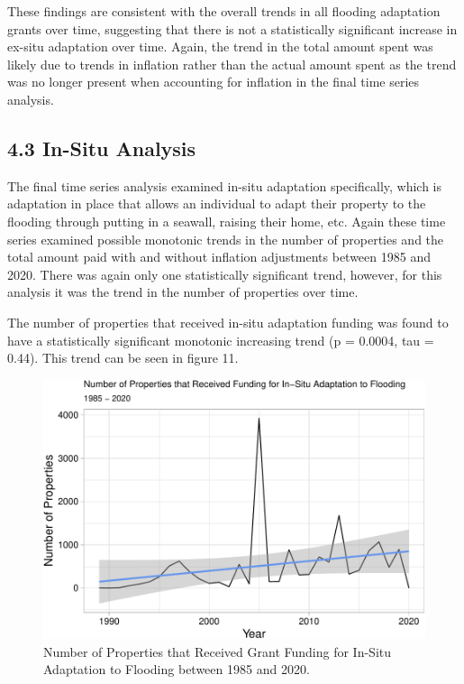 \documentclass[
  12pt,
]{article}
\begin{document}
These findings are consistent with the overall trends in all flooding
adaptation grants over time, suggesting that there is not a
statistically significant increase in ex-situ adaptation over time.
Again, the trend in the total amount spent was likely due to trends in
inflation rather than the actual amount spent as the trend was no longer
present when accounting for inflation in the final time series analysis.

\hypertarget{in-situ-analysis}{%
\subsection{4.3 In-Situ Analysis}\label{in-situ-analysis}}

The final time series analysis examined in-situ adaptation specifically,
which is adaptation in place that allows an individual to adapt their
property to the flooding through putting in a seawall, raising their
home, etc. Again these time series examined possible monotonic trends in
the number of properties and the total amount paid with and without
inflation adjustments between 1985 and 2020. There was again only one
statistically significant trend, however, for this analysis it was the
trend in the number of properties over time.

The number of properties that received in-situ adaptation funding was
found to have a statistically significant monotonic increasing trend (p
= 0.0004, tau = 0.44). This trend can be seen in figure 11.

\begin{figure}
\centering
\includegraphics{finalreport_files/figure-latex/unnamed-chunk-19-1.pdf}
\caption{Number of Properties that Received Grant Funding for In-Situ
Adaptation to Flooding between 1985 and 2020.}
\end{figure}
\end{document}
